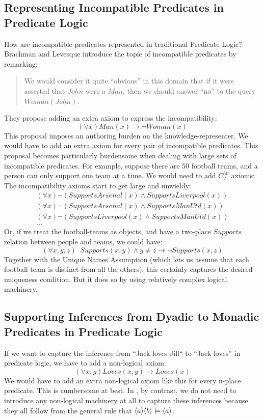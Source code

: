 \subsection{Representing Incompatible Predicates in Predicate Logic}
How are incompatible predicates represented in traditional Predicate Logic?
Brachman and Levesque\cite{brachman} introduce the topic of incompatible predicates by remarking:
\begin{quote}
We would consider it quite ``obvious'' in this domain that if it were asserted that $John$ were a $Man$, then we should answer ``no'' to the query $Woman(John)$.
\end{quote}
They propose adding an extra axiom to express the incompatibility:
\[
(\forall x) Man(x) \rightarrow \neg Woman(x)
\]   
This proposal imposes an authoring burden on the knowledge-representer.
We would have to add an extra axiom for every pair of incompatible predicates.
This proposal becomes particularly burdensome when dealing with large sets of incompatible predicates. 
For example, suppose there are 50 football teams, and a person can only support one team at a time. 
We would need to add $C^{50}_2$ axioms:
The incompatibility axioms start to get large and unwieldy:
\begin{eqnarray}
(\forall x) \neg (SupportsArsenal(x) \land SupportsLiverpool(x)) \nonumber \\
(\forall x) \neg (SupportsArsenal(x) \land SupportsManUtd(x)) \nonumber \\
(\forall x) \neg (SupportsLiverpool(x) \land SupportsManUtd(x)) \nonumber \\
... \nonumber
\end{eqnarray}   
Or, if we treat the football-teams as objects, and have a two-place $Supports$ relation between people and teams, we could have:
\[
(\forall x,y,z) \; \; Supports(x,y) \land y \neq z \rightarrow \neg Supports(x,z)
\]   
Together with the Unique Names Assumption (which lets us assume that each football team is distinct from all the others), this certainly captures the desired uniqueness condition.
But it does so by using relatively complex logical machinery.

\subsection{Supporting Inferences from Dyadic to Monadic Predicates in Predicate Logic}
If we want to capture the inference from ``Jack loves Jill`` to ``Jack loves'' in predicate logic, we have to add a non-logical axiom:
\[
(\forall x, y) Loves(x,y) \rightarrow Loves(x)
\]
We would have to add an extra non-logical axiom like this for every n-place predicate.
This is cumbersome at best. 
In \ELABR{}, by contrast, we do not need to introduce any non-logical machinery at all to capture these inferences because they all follow from the general rule that $\MAY{a} \MAY{b} \models \MAY{a}$.


